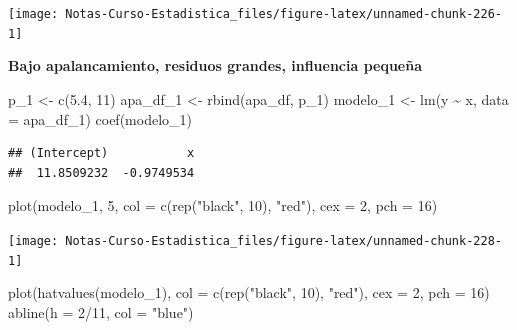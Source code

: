 \documentclass[
  12pt,
]{book}
\newenvironment{Shaded}{\begin{snugshade}}{\end{snugshade}}
\newcommand{\AttributeTok}[1]{\textcolor[rgb]{0.77,0.63,0.00}{#1}}
\newcommand{\DecValTok}[1]{\textcolor[rgb]{0.00,0.00,0.81}{#1}}
\newcommand{\FloatTok}[1]{\textcolor[rgb]{0.00,0.00,0.81}{#1}}
\newcommand{\FunctionTok}[1]{\textcolor[rgb]{0.00,0.00,0.00}{#1}}
\newcommand{\NormalTok}[1]{#1}
\newcommand{\OtherTok}[1]{\textcolor[rgb]{0.56,0.35,0.01}{#1}}
\newcommand{\SpecialCharTok}[1]{\textcolor[rgb]{0.00,0.00,0.00}{#1}}
\newcommand{\StringTok}[1]{\textcolor[rgb]{0.31,0.60,0.02}{#1}}
\theoremstyle{definition}
\theoremstyle{definition}
\theoremstyle{definition}
\theoremstyle{remark}
\begin{document}
\begin{center}\texttt{[image: Notas-Curso-Estadistica\_files/figure-latex/unnamed-chunk-226-1]} \end{center}

\textbf{Bajo apalancamiento, residuos grandes, influencia pequeña}

\begin{Shaded}
\begin{Highlighting}[]
\NormalTok{p\_1 }\OtherTok{\textless{}{-}} \FunctionTok{c}\NormalTok{(}\FloatTok{5.4}\NormalTok{, }\DecValTok{11}\NormalTok{)}
\NormalTok{apa\_df\_1 }\OtherTok{\textless{}{-}} \FunctionTok{rbind}\NormalTok{(apa\_df, p\_1)}
\NormalTok{modelo\_1 }\OtherTok{\textless{}{-}} \FunctionTok{lm}\NormalTok{(y }\SpecialCharTok{\textasciitilde{}}\NormalTok{ x, }\AttributeTok{data =}\NormalTok{ apa\_df\_1)}
\FunctionTok{coef}\NormalTok{(modelo\_1)}
\end{Highlighting}
\end{Shaded}

\begin{verbatim}
## (Intercept)           x 
##  11.8509232  -0.9749534
\end{verbatim}

\begin{Shaded}
\begin{Highlighting}[]
\FunctionTok{plot}\NormalTok{(modelo\_1, }\DecValTok{5}\NormalTok{, }\AttributeTok{col =} \FunctionTok{c}\NormalTok{(}\FunctionTok{rep}\NormalTok{(}\StringTok{"black"}\NormalTok{, }\DecValTok{10}\NormalTok{), }\StringTok{"red"}\NormalTok{), }
    \AttributeTok{cex =} \DecValTok{2}\NormalTok{, }\AttributeTok{pch =} \DecValTok{16}\NormalTok{)}
\end{Highlighting}
\end{Shaded}

\begin{center}\texttt{[image: Notas-Curso-Estadistica\_files/figure-latex/unnamed-chunk-228-1]} \end{center}

\begin{Shaded}
\begin{Highlighting}[]
\FunctionTok{plot}\NormalTok{(}\FunctionTok{hatvalues}\NormalTok{(modelo\_1), }\AttributeTok{col =} \FunctionTok{c}\NormalTok{(}\FunctionTok{rep}\NormalTok{(}\StringTok{"black"}\NormalTok{, }\DecValTok{10}\NormalTok{), }
    \StringTok{"red"}\NormalTok{), }\AttributeTok{cex =} \DecValTok{2}\NormalTok{, }\AttributeTok{pch =} \DecValTok{16}\NormalTok{)}
\FunctionTok{abline}\NormalTok{(}\AttributeTok{h =} \DecValTok{2}\SpecialCharTok{/}\DecValTok{11}\NormalTok{, }\AttributeTok{col =} \StringTok{"blue"}\NormalTok{)}
\end{Highlighting}
\end{Shaded}
\end{document}
